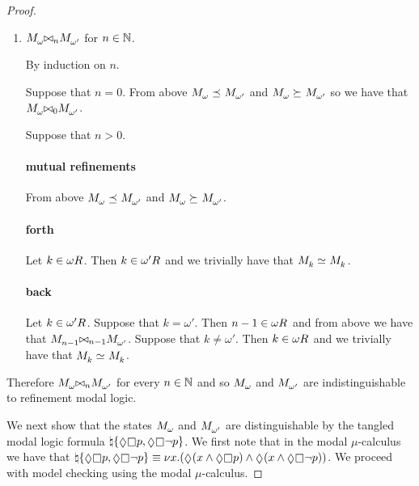 \begin{proof}
\begin{enumerate}
    \item $\kPModel{\omega} \bisimref[n] \kPModel{\omega'}$ for $n \in \mathbb{N}$.

    By induction on $n$.

    Suppose that $n = 0$. 
    From above $\kPModel{\omega} \refines \kPModel{\omega'}$
    and  $\kPModel{\omega} \simulates \kPModel{\omega'}$
    so we have that $\kPModel{\omega} \bisimref[0] \kPModel{\omega'}$.

    Suppose that $n > 0$.

    \paragraph{mutual refinements} From above $\kPModel{\omega} \refines \kPModel{\omega'}$
    and  $\kPModel{\omega} \simulates \kPModel{\omega'}$.

    \paragraph{forth} Let $k \in \kSuccessors{}{\omega}$.
    Then $k \in \kSuccessors{}{\omega'}$ and we trivially have that $\kPModel{k} \bisimilar \kPModel{k}$.

    \paragraph{back} Let $k \in \kSuccessors{}{\omega'}$.
    Suppose that $k = \omega'$.
    Then $n - 1 \in \kSuccessors{}{\omega}$ and from above we have that $\kPModel{n - 1} \bisimref[n - 1] \kPModel{\omega'}$.
    Suppose that $k \neq \omega'$.
    Then $k \in \kSuccessors{}{\omega}$ and we trivially have that $\kPModel{k} \bisimilar \kPModel{k}$.
\end{enumerate}

Therefore $\kPModel{\omega} \bisimref[n] \kPModel{\omega'}$ for every $n \in \mathbb{N}$
and so $\kPModel{\omega}$ and $\kPModel{\omega'}$ are indistinguishable to refinement modal logic.

We next show that the states $\kPModel{\omega}$ and $\kPModel{\omega'}$ are distinguishable by the tangled modal logic formula
$\tangle \{\possible \necessary \atomP, \possible \necessary \neg \atomP\}$.
We first note that in the modal $\mu$-calculus we have that 
$\tangle \{\possible \necessary \atomP, \possible \necessary \neg \atomP\} \equiv \gfp{\varX} (\possible (\varX \land \possible \necessary \atomP) \land \possible (\varX \land \possible \necessary \neg \atomP))$.
We proceed with model checking using the modal $\mu$-calculus.


\end{proof}
